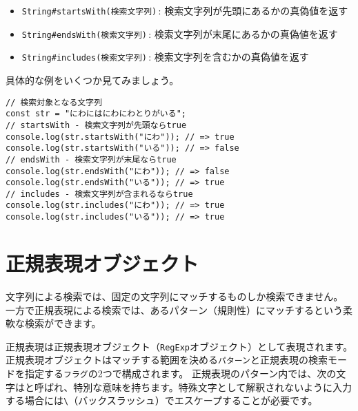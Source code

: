 \begin{itemize}
\item
  \texttt{String\#startsWith(検索文字列)}\,\protect{}:
  検索文字列が先頭にあるかの真偽値を返す
\item
  \texttt{String\#endsWith(検索文字列)}\,\protect{}:
  検索文字列が末尾にあるかの真偽値を返す
\item
  \texttt{String\#includes(検索文字列)}\,\protect{}:
  検索文字列を含むかの真偽値を返す
\end{itemize}

具体的な例をいくつか見てみましょう。

\begin{lstlisting}
// 検索対象となる文字列
const str = "にわにはにわにわとりがいる";
// startsWith - 検索文字列が先頭ならtrue
console.log(str.startsWith("にわ")); // => true
console.log(str.startsWith("いる")); // => false
// endsWith - 検索文字列が末尾ならtrue
console.log(str.endsWith("にわ")); // => false
console.log(str.endsWith("いる")); // => true
// includes - 検索文字列が含まれるならtrue
console.log(str.includes("にわ")); // => true
console.log(str.includes("いる")); // => true
\end{lstlisting}

\hypertarget{regexp-object}{%
\section{正規表現オブジェクト}\label{regexp-object}}

文字列による検索では、固定の文字列にマッチするものしか検索できません。
一方で正規表現による検索では、あるパターン（規則性）にマッチするという柔軟な検索ができます。

正規表現は正規表現オブジェクト（\texttt{RegExp}オブジェクト）として表現されます。
正規表現オブジェクトはマッチする範囲を決める\texttt{パターン}と正規表現の検索モードを指定する\texttt{フラグ}の2つで構成されます。
正規表現のパターン内では、次の文字は\textbf{}と呼ばれ、特別な意味を持ちます。特殊文字として解釈されないように入力する場合には\texttt{\textbackslash}\index{\\@\texttt{\textbackslash}}（バックスラッシュ）でエスケープすることが必要です。


